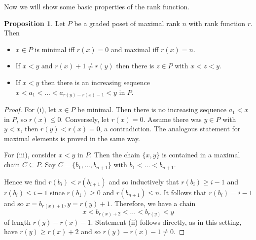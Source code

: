 \documentclass{scrartcl}
\theoremstyle{definition}
\newtheorem{proposition}[definition]{Proposition}
\begin{document}
Now we will show some basic properties of the rank function.
\begin{proposition}
    Let $P$ be a graded poset of maximal rank $n$ with rank function $r$.
    Then
    \begin{itemize}
        \item $x \in P$ is minimal iff $r(x) = 0$ and maximal iff $r(x) = n$.
        \item If $x < y$ and $r(x) + 1 \neq r(y)$ then there is $z \in P$ with $x < z < y$.
        \item If $x < y$ then there is an increasing sequence $x < a_1 < ... < a_{r(y) - r(x) - 1} < y$ in $P$. 
    \end{itemize}
\end{proposition}
\begin{proof}
    For (i), let $x \in P$ be minimal. Then there is no increasing sequence $a_1 < x$ in $P$, so $r(x) \leq 0$.
    Conversely, let $r(x) = 0$. Assume there was $y \in P$ with $y < x$, then $r(y) < r(x) = 0$, a contradiction.
    The analogous statement for maximal elements is proved in the same way.
    
    For (iii), consider $x < y$ in $P$. Then the chain $\{ x, y \}$ is contained in a maximal chain $C \subseteq P$.
    Say $C = \{ b_1, ..., b_{n + 1} \}$ with $b_1 < ... < b_{n + 1}$.

    Hence we find $r(b_i) < r(b_{i + 1})$ and so inductively that $r(b_i) \geq i - 1$ and $r(b_i) \leq i - 1$ since $r(b_1) \geq 0$ and $r(b_{n + 1}) \leq n$.
    It follows that $r(b_i) = i - 1$ and so $x = b_{r(x) + 1}, y = {r(y) + 1}$.
    Therefore, we have a chain
    \begin{equation*}
        x < b_{r(x) + 2} < ... < b_{r(y)} < y
    \end{equation*}
    of length $r(y) - r(x) - 1$.
    Statement (ii) follows directly, as in this setting, have $r(y) \geq r(x) + 2$ and so $r(y) - r(x) - 1 \neq 0$.
\end{proof}
\end{document}
